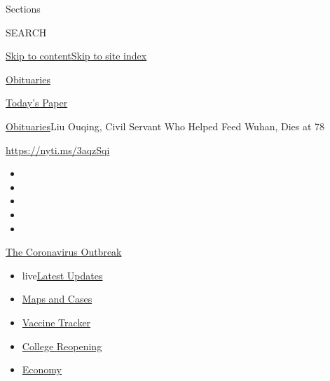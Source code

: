 Sections

SEARCH

\protect\hyperlink{site-content}{Skip to
content}\protect\hyperlink{site-index}{Skip to site index}

\href{https://www.nytimes3xbfgragh.onion/section/obituaries}{Obituaries}

\href{https://myaccount.nytimes3xbfgragh.onion/auth/login?response_type=cookie\&client_id=vi}{}

\href{https://www.nytimes3xbfgragh.onion/section/todayspaper}{Today's
Paper}

\href{/section/obituaries}{Obituaries}\textbar{}Liu Ouqing, Civil
Servant Who Helped Feed Wuhan, Dies at 78

\url{https://nyti.ms/3aqzSqi}

\begin{itemize}
\item
\item
\item
\item
\item
\end{itemize}

\href{https://www.nytimes3xbfgragh.onion/news-event/coronavirus?action=click\&pgtype=Article\&state=default\&region=TOP_BANNER\&context=storylines_menu}{The
Coronavirus Outbreak}

\begin{itemize}
\tightlist
\item
  live\href{https://www.nytimes3xbfgragh.onion/2020/08/04/world/coronavirus-covid-19.html?action=click\&pgtype=Article\&state=default\&region=TOP_BANNER\&context=storylines_menu}{Latest
  Updates}
\item
  \href{https://www.nytimes3xbfgragh.onion/interactive/2020/us/coronavirus-us-cases.html?action=click\&pgtype=Article\&state=default\&region=TOP_BANNER\&context=storylines_menu}{Maps
  and Cases}
\item
  \href{https://www.nytimes3xbfgragh.onion/interactive/2020/science/coronavirus-vaccine-tracker.html?action=click\&pgtype=Article\&state=default\&region=TOP_BANNER\&context=storylines_menu}{Vaccine
  Tracker}
\item
  \href{https://www.nytimes3xbfgragh.onion/2020/08/02/us/covid-college-reopening.html?action=click\&pgtype=Article\&state=default\&region=TOP_BANNER\&context=storylines_menu}{College
  Reopening}
\item
  \href{https://www.nytimes3xbfgragh.onion/live/2020/08/03/business/stock-market-today-coronavirus?action=click\&pgtype=Article\&state=default\&region=TOP_BANNER\&context=storylines_menu}{Economy}
\end{itemize}

